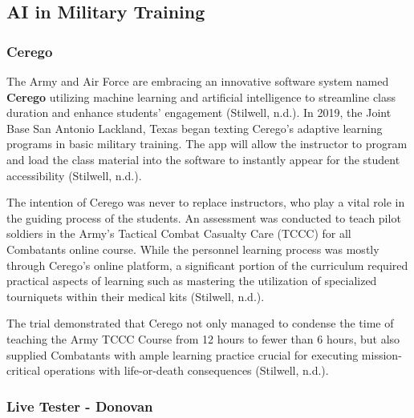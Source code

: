 \documentclass[
]{article}
\begin{document}
\hypertarget{ai-in-military-training}{%
\subsection{AI in Military Training}\label{ai-in-military-training}}

\hypertarget{cerego}{%
\subsubsection{Cerego}\label{cerego}}

The Army and Air Force are embracing an innovative software system named \textbf{Cerego} utilizing machine learning and artificial intelligence to streamline class duration and enhance students' engagement (Stilwell, n.d.). In 2019, the Joint Base San Antonio Lackland, Texas began texting Cerego's adaptive learning programs in basic military training. The app will allow the instructor to program and load the class material into the software to instantly appear for the student accessibility (Stilwell, n.d.).

The intention of Cerego was never to replace instructors, who play a vital role in the guiding process of the students. An assessment was conducted to teach pilot soldiers in the Army's Tactical Combat Casualty Care (TCCC) for all Combatants online course. While the personnel learning process was mostly through Cerego's online platform, a significant portion of the curriculum required practical aspects of learning such as mastering the utilization of specialized tourniquets within their medical kits (Stilwell, n.d.).

The trial demonstrated that Cerego not only managed to condense the time of teaching the Army TCCC Course from 12 hours to fewer than 6 hours, but also supplied Combatants with ample learning practice crucial for executing mission-critical operations with life-or-death consequences (Stilwell, n.d.).

\hypertarget{live-tester---donovan}{%
\subsubsection{Live Tester - Donovan}\label{live-tester---donovan}}
\end{document}

